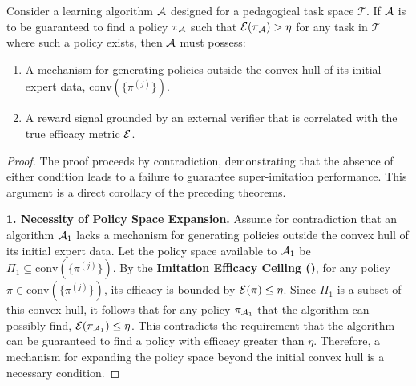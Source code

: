 \begin{theorem}
\label{thm:nfl}
Consider a learning algorithm $\mathcal{A}$ designed for a pedagogical task space $\mathcal{T}$. If $\mathcal{A}$ is to be guaranteed to find a policy $\pi_{\mathcal{A}}$ such that $\mathcal{E}(\pi_{\mathcal{A}}) > \eta$ for any task in $\mathcal{T}$ where such a policy exists, then $\mathcal{A}$ must possess:
\begin{enumerate}
    \item A mechanism for generating policies outside the convex hull of its initial expert data, $\text{conv}(\{\pi^{(j)}\})$.
    \item A reward signal grounded by an external verifier that is correlated with the true efficacy metric $\mathcal{E}$.
\end{enumerate}
\end{theorem}
\begin{proof}
The proof proceeds by contradiction, demonstrating that the absence of either condition leads to a failure to guarantee super-imitation performance. This argument is a direct corollary of the preceding theorems.

\noindent\textbf{1. Necessity of Policy Space Expansion.}
Assume for contradiction that an algorithm $\mathcal{A}_1$ lacks a mechanism for generating policies outside the convex hull of its initial expert data. Let the policy space available to $\mathcal{A}_1$ be $\Pi_1 \subseteq \text{conv}(\{\pi^{(j)}\})$.
By the \textbf{Imitation Efficacy Ceiling ()}, for any policy $\pi \in \text{conv}(\{\pi^{(j)}\})$, its efficacy is bounded by $\mathcal{E}(\pi) \le \eta$.
Since $\Pi_1$ is a subset of this convex hull, it follows that for any policy $\pi_{\mathcal{A}_1}$ that the algorithm can possibly find, $\mathcal{E}(\pi_{\mathcal{A}_1}) \le \eta$.
This contradicts the requirement that the algorithm can be guaranteed to find a policy with efficacy greater than $\eta$. Therefore, a mechanism for expanding the policy space beyond the initial convex hull is a necessary condition.


\end{proof}
